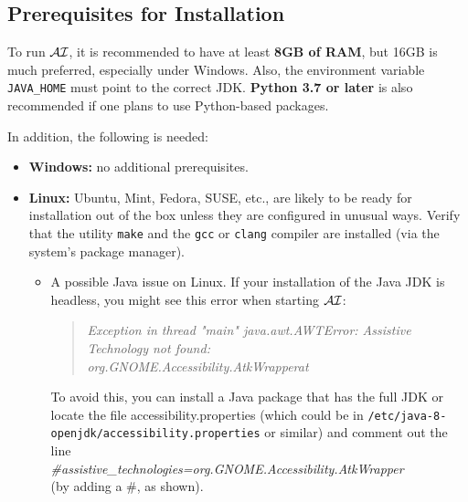 \documentclass[11pt]{article}
\newcommand{\ERGOAI}{\mbox{\smaller{\ensuremath{\cal{E}}\smaller{{\sc{RGO}}}}\ensuremath{\cal{AI}}}\xspace}
\begin{document}
\subsection{Prerequisites for Installation}\label{sec-inst-prereq}

To run \ERGOAI, it is recommended to have at least \textbf{8GB of RAM}, but
16GB is much preferred, especially under Windows.
Also,
the environment variable \texttt{JAVA\_HOME} must point to the correct JDK.
\textbf{Python 3.7 or later} is also
recommended if one plans to use Python-based packages.

\noindent
In addition, the following is needed:
\begin{itemize}
\item[] \textbf{Windows:}  no additional prerequisites.
\item[] \textbf{Linux:} Ubuntu, Mint, Fedora, SUSE, etc., are likely to be
  ready for installation out of the box unless they are configured in
  unusual ways.  Verify that the utility \texttt{make}  and the
  \texttt{gcc} or \texttt{clang}    compiler are
  installed (via the system's package manager).

  \begin{itemize}
  \item A possible Java issue on Linux.  If your installation of the Java JDK
    is headless, you might see this error when starting \ERGOAI:
    
    \begin{quote}
      \it
      Exception in thread "main" java.awt.AWTError: Assistive Technology not found:\\
      org.GNOME.Accessibility.AtkWrapperat
    \end{quote}
    
    To avoid this, you can install a Java package that has the full JDK or
    locate the file accessibility.properties (which could be in
    \texttt{/etc/java-8-openjdk/accessibility.properties} or similar) and comment
    out the line
    \\
    \hspace*{8mm}
    \emph{\#assistive\_technologies=org.GNOME.Accessibility.AtkWrapper}
    \\
    (by adding a \#, as shown).
    

\end{itemize}
\end{itemize}
\end{document}
